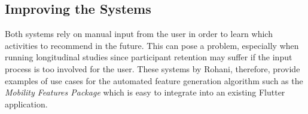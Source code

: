 \subsection{Improving the Systems}
Both systems rely on manual input from the user in order to learn which activities to recommend in the future. This can pose a problem, especially when running longitudinal studies since participant retention may suffer if the input process is too involved for the user. These systems by Rohani, therefore, provide examples of use cases for the automated feature generation algorithm such as the \textit{Mobility Features Package} which is easy to integrate into an existing Flutter application.
